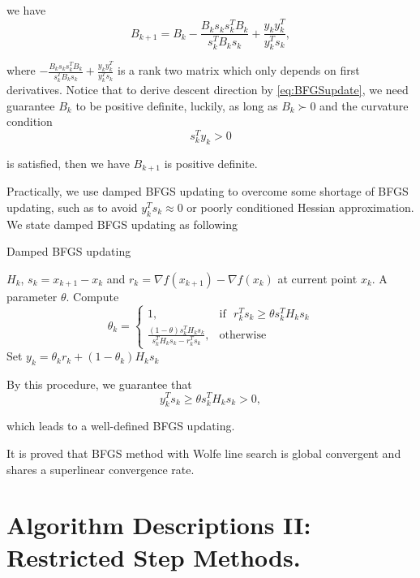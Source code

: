 \documentclass[11pt]{report}
\begin{document}
we have 
\begin{equation}
    B_{k+1} = B_k -\frac{B_ks_ks_k^TB_k}{s_k^TB_ks_k}+\frac{y_ky_k^T}{y_k^Ts_k},
\end{equation}

where $-\frac{B_ks_ks_k^TB_k}{s_k^TB_ks_k}+\frac{y_ky_k^T}{y_k^Ts_k}$ is a rank two matrix which only depends on first derivatives. Notice that to derive descent direction by \eqref{eq:BFGSupdate}, we need guarantee $B_k$ to be positive definite, luckily, as long as $B_k\succ 0$  and the curvature condition
\begin{equation}
    s_k^Ty_k >0
\end{equation}

is satisfied, then we have $B_{k+1}$ is positive definite.

Practically, we use damped BFGS updating to overcome some shortage of BFGS updating, such as to avoid $y_k^Ts_k\approx 0$ or poorly conditioned Hessian approximation. We state damped BFGS updating as following
\begin{algorithm}[H]
\caption{Damped BFGS updating}
\label{alg:Damped BFGS updating}
\begin{algorithmic}[1]
\REQUIRE $H_k$, $s_k=x_{k+1}-x_k$ and $r_k = \nabla f(x_{k+1})-\nabla f(x_k)$ at current point $x_k$. A parameter $\theta$.
\STATE Compute
\begin{equation}
    \theta_k = \begin{cases}
        1, & \mbox{if~~} r_k^Ts_k \geq \theta s_k^TH_ks_k\\
        \frac{(1-\theta)s_k^TH_ks_k}{s_k^TH_ks_k-r_k^Ts_k}, &\mbox{otherwise}
    \end{cases}
\end{equation}
\STATE Set $y_k = \theta_k r_k + (1-\theta_k)H_ks_k$
\end{algorithmic}
\end{algorithm}

By this procedure, we guarantee that 
\begin{equation}
    y_k^Ts_k \geq \theta s_k^TH_ks_k >0,
\end{equation}

which leads to a well-defined BFGS updating.

It is proved that BFGS method with Wolfe line search is global convergent and shares a superlinear convergence rate. 

\chapter{Algorithm Descriptions II: Restricted Step Methods.}\label{chp: restricted}
\end{document}
